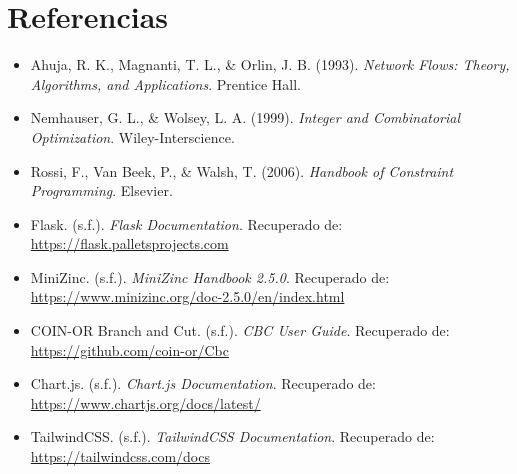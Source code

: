 \documentclass[11pt,letter]{article}
\begin{document}
\section{Referencias}

\begin{itemize}
    \item Ahuja, R. K., Magnanti, T. L., \& Orlin, J. B. (1993). \textit{Network Flows: Theory, Algorithms, and Applications}. Prentice Hall.

    \item Nemhauser, G. L., \& Wolsey, L. A. (1999). \textit{Integer and Combinatorial Optimization}. Wiley-Interscience.

    \item Rossi, F., Van Beek, P., \& Walsh, T. (2006). \textit{Handbook of Constraint Programming}. Elsevier.

    \item Flask. (s.f.). \textit{Flask Documentation}. Recuperado de: \url{https://flask.palletsprojects.com}

    \item MiniZinc. (s.f.). \textit{MiniZinc Handbook 2.5.0}. Recuperado de: \url{https://www.minizinc.org/doc-2.5.0/en/index.html}

    \item COIN-OR Branch and Cut. (s.f.). \textit{CBC User Guide}. Recuperado de: \url{https://github.com/coin-or/Cbc}

    \item Chart.js. (s.f.). \textit{Chart.js Documentation}. Recuperado de: \url{https://www.chartjs.org/docs/latest/}

    \item TailwindCSS. (s.f.). \textit{TailwindCSS Documentation}. Recuperado de: \url{https://tailwindcss.com/docs}
\end{itemize}
\end{document}
